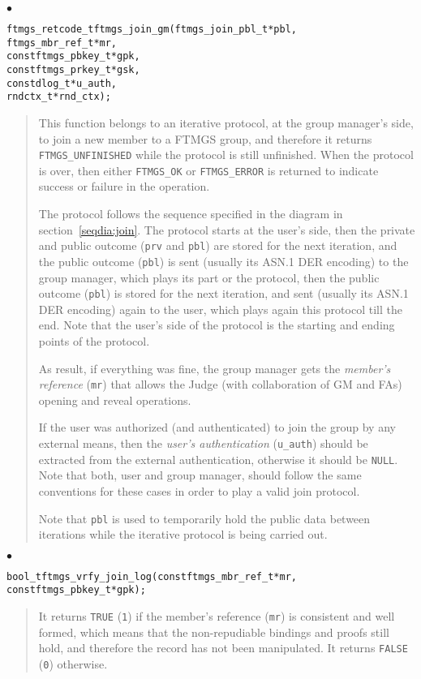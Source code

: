 \documentclass[a4paper]{article}
\newenvironment{api}%
{\noindent$\bullet$\hfill\begin{minipage}[t]{0.97\linewidth}\footnotesize\begin{alltt}}%
{\end{alltt}\end{minipage}}%
\begin{document}
\begin{api}
ftmgs_retcode_t ftmgs_join_gm(ftmgs_join_pbl_t* pbl,
                              ftmgs_mbr_ref_t* mr,
                              const ftmgs_pbkey_t* gpk,
                              const ftmgs_prkey_t* gsk,
                              const dlog_t* u_auth,
                              rndctx_t* rnd_ctx);
\end{api}
\begin{quote}\footnotesize
This function belongs to an iterative protocol, at the group manager's
side, to join a new member to a FTMGS group, and therefore it returns
\verb|FTMGS_UNFINISHED| while the protocol is still unfinished. When
the protocol is over, then either \verb|FTMGS_OK| or
\verb|FTMGS_ERROR| is returned to indicate success or failure in the
operation.

The protocol follows the sequence specified in the diagram in
section~\ref{seqdia:join}. The protocol starts at the user's side,
then the private and public outcome (\verb|prv| and \verb|pbl|) are
stored for the next iteration, and the public outcome (\verb|pbl|) is
sent (usually its ASN.1 DER encoding) to the group manager, which
plays its part or the protocol, then the public outcome (\verb|pbl|)
is stored for the next iteration, and sent (usually its ASN.1 DER
encoding) again to the user, which plays again this protocol till the
end. Note that the user's side of the protocol is the starting and
ending points of the protocol.

As result, if everything was fine, the group manager gets the \emph{member's
  reference} (\verb|mr|) that allows the Judge (with collaboration of
GM and FAs) opening and reveal operations.

If the user was authorized (and authenticated) to join the group by
any external means, then the \emph{user's authentication}
(\verb|u_auth|) should be extracted from the external authentication,
otherwise it should be \verb|NULL|. Note that both, user and group
manager, should follow the same conventions for these cases in order
to play a valid join protocol.

Note that \verb|pbl| is used to temporarily hold the public data
between iterations while the iterative protocol is being carried out.
\end{quote}
\begin{api}
bool_t ftmgs_vrfy_join_log(const ftmgs_mbr_ref_t* mr,
                           const ftmgs_pbkey_t* gpk);
\end{api}
\begin{quote}\footnotesize
It returns \verb|TRUE| (\verb|1|) if the member's reference
(\verb|mr|) is consistent and well formed, which means that the
non-repudiable bindings and proofs still hold, and therefore the
record has not been manipulated. It returns \verb|FALSE| (\verb|0|)
otherwise.
\end{quote} 
\end{document}
